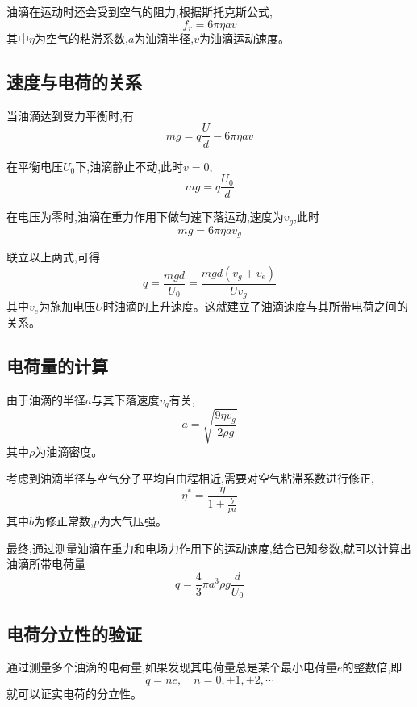 \documentclass[UTF8]{ctexart}
\begin{document}
油滴在运动时还会受到空气的阻力,根据斯托克斯公式,
\begin{equation}
    f_r = 6\pi \eta av
\end{equation}
其中$\eta$为空气的粘滞系数,$a$为油滴半径,$v$为油滴运动速度。

\subsection{速度与电荷的关系}
当油滴达到受力平衡时,有
\begin{equation}
    mg = q\frac{U}{d} - 6\pi \eta av
\end{equation}

在平衡电压$U_0$下,油滴静止不动,此时$v=0$,
\begin{equation}
    mg = q\frac{U_0}{d}
\end{equation}

在电压为零时,油滴在重力作用下做匀速下落运动,速度为$v_g$,此时
\begin{equation}
    mg = 6\pi \eta av_g
\end{equation}

联立以上两式,可得
\begin{equation}
    q = \frac{mgd}{U_0} = \frac{mgd(v_g+v_e)}{Uv_g}
\end{equation}
其中$v_e$为施加电压$U$时油滴的上升速度。这就建立了油滴速度与其所带电荷之间的关系。

\subsection{电荷量的计算}
由于油滴的半径$a$与其下落速度$v_g$有关,
\begin{equation}
    a = \sqrt{\frac{9\eta v_g}{2\rho g}}
\end{equation}
其中$\rho$为油滴密度。

考虑到油滴半径与空气分子平均自由程相近,需要对空气粘滞系数进行修正,
\begin{equation}
    \eta^* = \frac{\eta}{1+\frac{b}{pa}}
\end{equation}
其中$b$为修正常数,$p$为大气压强。

最终,通过测量油滴在重力和电场力作用下的运动速度,结合已知参数,就可以计算出油滴所带电荷量
\begin{equation}
    q = \frac{4}{3}\pi a^3 \rho g \frac{d}{U_0}
\end{equation}

\subsection{电荷分立性的验证}
通过测量多个油滴的电荷量,如果发现其电荷量总是某个最小电荷量$e$的整数倍,即
\begin{equation}
    q = ne, \quad n=0,\pm1,\pm2,\cdots
\end{equation}
就可以证实电荷的分立性。
\end{document}
